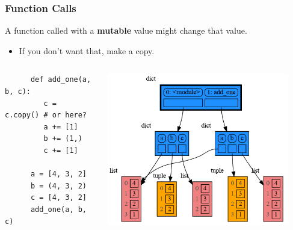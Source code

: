 \documentclass[10pt, colorlinks=true, urlcolor=blue]{beamer}
\begin{document}
\begin{frame}[fragile]
  \frametitle{Function Calls}
  A function called with a \textbf{mutable} value might change that value.
  \begin{itemize}
  \item If you don't want that, make a copy.
  \end{itemize}

  \begin{columns}
    \begin{verbatim}
      def add_one(a, b, c):
         c = c.copy() # or here?
         a += [1]
         b += (1,)
         c += [1]
         
      a = [4, 3, 2]
      b = (4, 3, 2)
      c = [4, 3, 2]
      add_one(a, b, c)
    \end{verbatim}
    \begin{center}\includegraphics[width=0.9\textwidth]{figures/function_call.png}\end{center}
  \end{columns}
\end{frame}
\end{document}

